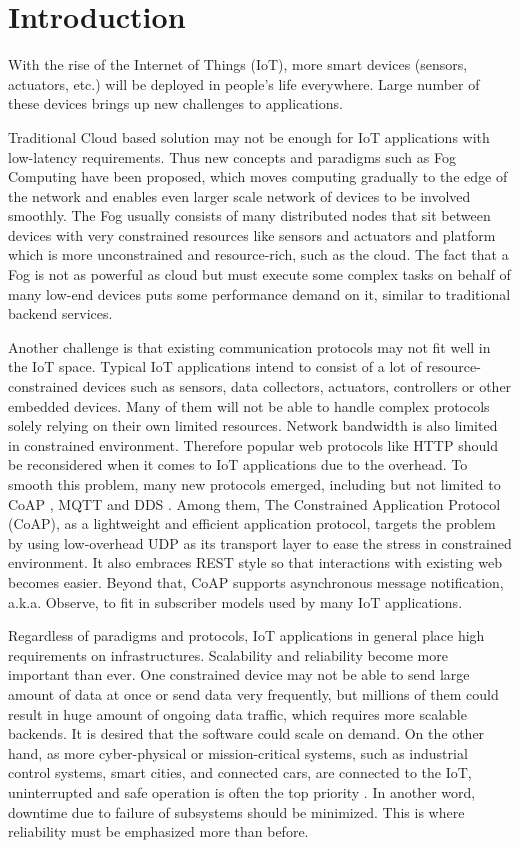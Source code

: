 \chapter{Introduction}\label{ch1}

With the rise of the Internet of Things (IoT), more smart devices (sensors, actuators, etc.) will be deployed in people's life everywhere. Large number of these devices brings up new challenges to applications. 

Traditional Cloud based solution may not be enough for IoT applications with low-latency requirements. Thus new concepts and paradigms such as Fog Computing \cite{Bonomi:2012:FCR:2342509.2342513} have been proposed, which moves computing gradually to the edge of the network and enables even larger scale network of devices to be involved smoothly. The Fog usually consists of many distributed nodes that sit between devices with very constrained resources like sensors and actuators and platform which is more unconstrained and resource-rich, such as the cloud. The fact that a Fog is not as powerful as cloud but must execute some complex tasks on behalf of many low-end devices puts some performance demand on it, similar to traditional backend services.

Another challenge is that existing communication protocols may not fit well in the IoT space. Typical IoT applications intend to consist of a lot of resource-constrained devices such as sensors, data collectors, actuators, controllers or other embedded devices. Many of them will not be able to handle complex protocols solely relying on their own limited resources. Network bandwidth is also limited in constrained environment. Therefore popular web protocols like HTTP should be reconsidered when it comes to IoT applications due to the overhead. To smooth this problem, many new protocols emerged, including but not limited to CoAP \cite{coap_protocol}, MQTT \cite{mqtt_protocol} and DDS \cite{dds}. Among them, The Constrained Application Protocol (CoAP), as a lightweight and efficient application protocol, targets the problem by using low-overhead UDP as its transport layer to ease the stress in constrained environment. It also embraces REST style so that interactions with existing web becomes easier. Beyond that, CoAP supports asynchronous message notification, a.k.a. Observe, to fit in subscriber models used by many IoT applications. 

Regardless of paradigms and protocols, IoT applications in general place high requirements on infrastructures. Scalability and reliability become more important than ever. One constrained device may not be able to send large amount of data at once or send data very frequently, but millions of them could result in huge amount of ongoing data traffic, which requires more scalable backends. It is desired that the software could scale on demand. On the other hand, as more cyber-physical or mission-critical systems, such as industrial control systems, smart cities, and connected cars, are connected to the IoT, uninterrupted and safe operation is often the top priority \cite{7498684}. In another word, downtime due to failure of subsystems should be minimized. This is where reliability must be emphasized more than before. 

